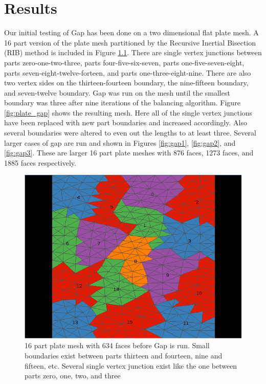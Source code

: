 \documentclass{thesis}
\begin{document}
\chapter{Results}

Our initial testing of Gap has been done on a two dimensional flat plate mesh. 
A 16 part version of the plate mesh partitioned by  the Recursive Inertial 
Bisection (RIB) method \cite{williamsRIB,taylorRIB} is included in Figure 
\ref{fig:plate}. There are single vertex junctions between parts 
zero-one-two-three, 
parts four-five-six-seven, parts one-five-seven-eight, parts 
seven-eight-twelve-forteen, and parts one-three-eight-nine. There are 
also two vertex sides on the thirteen-fourteen boundary, the nine-fifteen 
boundary, and seven-twelve 
boundary. Gap was run on the mesh until the smallest boundary was three after 
nine 
iterations of the balancing algorithm. Figure \ref{fig:plate_gap} shows the 
resulting mesh. Here all of the single vertex junctions have been replaced with 
new part boundaries and increased accordingly. Also several boundaries were 
altered to even out the lengths to at least three. Several larger cases of gap are run and shown in Figures \ref{fig:gap1}, \ref{fig:gap2}, and \ref{fig:gap3}. These are larger 16 part plate meshes with 876 faces, 1273 faces, and 1885 faces respectively.  

\begin{figure} [!hb]
\centering
\captionsetup{justification=centering,margin=1cm}
\includegraphics[width=.6\textwidth]{results_before.png}
\caption{\label{fig:plate} \textnormal{16 part plate mesh with 634 faces before Gap is run. Small boundaries exist between parts thirteen and fourteen, nine and fifteen, etc. Several single vertex junction exist like the one between parts zero, one, two, and three}}
\end{figure}
\end{document}
